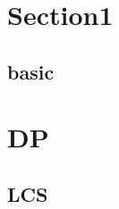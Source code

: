 \section{Section1}
    \subsection{basic}
        

%         

\section{DP}
    \subsection{LCS}
        
%              
%             
